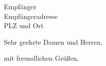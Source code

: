 \documentclass[a4paper,11pt]{letter}
\begin{document}
\begin{letter}{Empfänger\\Empfängeradresse\\PLZ und Ort}
	
\opening{Sehr geehrte Damen und Herren,}


\closing{mit freundlichen Grüßen,}


\end{letter}
\end{document}
